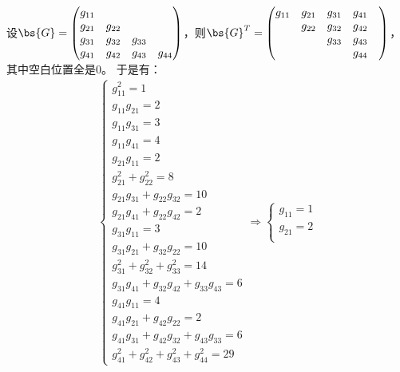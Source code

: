 \documentclass[12pt, a4paper, oneside, UTF8]{ctexbook}
\begin{document}
\begin{solution}
    设$\bs{G}=\begin{pmatrix}
        g_{11}& & &\\
        g_{21}&g_{22}& &\\
        g_{31}&g_{32}&g_{33}& \\
        g_{41}&g_{42}&g_{43}&g_{44}\\
    \end{pmatrix}$，则$\bs{G}^T=\begin{pmatrix}
        g_{11}& g_{21}&g_{31}&g_{41}\\
        &g_{22}&g_{32}&g_{42}&\\
        & &g_{33}&g_{43}\\
        & & & g_{44}
    \end{pmatrix}$，其中空白位置全是$0$。
    于是有：
    \begin{align*}
        \left\{
            \begin{array}{ll}
                g_{11}^2=1\\
                g_{11}g_{21}=2\\
                g_{11}g_{31}=3\\
                g_{11}g_{41}=4 \\
                g_{21}g_{11}=2\\
                g_{21}^2+g_{22}^2=8\\
                g_{21}g_{31}+g_{22}g_{32}=10\\
                g_{21}g_{41}+g_{22}g_{42}=2 \\
                g_{31}g_{11}=3\\
                g_{31}g_{21}+g_{32}g_{22}=10\\
                g_{31}^2+g_{32}^2+g_{33}^2=14\\
                g_{31}g_{41}+g_{32}g_{42}+g_{33}g_{43}=6 \\
                g_{41}g_{11}=4 \\
                g_{41}g_{21}+g_{42}g_{22}=2 \\
                g_{41}g_{31}+g_{42}g_{32}+g_{43}g_{33}= 6\\
                g_{41}^2+g_{42}^2+g_{43}^2+g_{44}^2=29
            \end{array}
            \right.
            \Rightarrow
        \left\{
            \begin{array}{ll}
                g_{11}=1\\
                g_{21}=2\\

\end{array}
\end{align*}
\end{solution}
\end{document}
